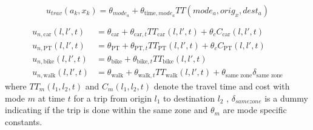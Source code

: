 
\newcommand{\car}{\text{car}}
\newcommand{\pt}{\text{PT}}
\newcommand{\walk}{\text{walk}}
\newcommand{\bike}{\text{bike}}
\newcommand{\dummy}[1]{\delta_{#1}}
\newcommand{\hi}{\text{h.i}}
\newcommand{\wait}{\text{wait}}
\newcommand{\geqfive}{\text{same zone}}
\newcommand{\mc}{\theta}
\newcommand{\ac}{c}
\newcommand{\dura}[1]{\Delta t_#1}
\newcommand{\TT}{TT}
\begin{equation}
    u_{trav}(a_k,x_k) = \mc_{{mode}_a} + \theta_{\text{time},{mode}_a} \TT({mode}_a,{orig}_x,{dest}_a)
\end{equation}

\begin{align*}
u_{n,\car}(l,l',t) &= \mc_\car + \theta_{\car,t} \TT_\car(l,l',t) + \theta_{c} C_\car(l,l',t) \\
u_{n,\pt}(l,l',t) &= \mc_\pt + \theta_{\pt,t} \TT_\pt(l,l',t) + \theta_{c}  C_\pt(l,l',t) \\
u_{n,\bike}(l,l',t) &= \mc_\bike + \theta_{\bike,t} \TT_\bike(l,l',t) \\
u_{n,\walk}(l,l',t) &= \mc_\walk + \theta_{\walk,t} \TT_\walk(l,l',t) + \theta_{\geqfive} \dummy{\geqfive}
\end{align*}
where $\TT_m(l_1,l_2,t)$ and $C_m(l_1,l_2,t)$ denote the travel time and cost with mode $m$ at time $t$ for a trip from origin $l_1$ to destination $l_2$ , $\dummy{same zone}$ is a dummy indicating if the trip is done within the same zone and $\mc_m$ are mode specific constants.


